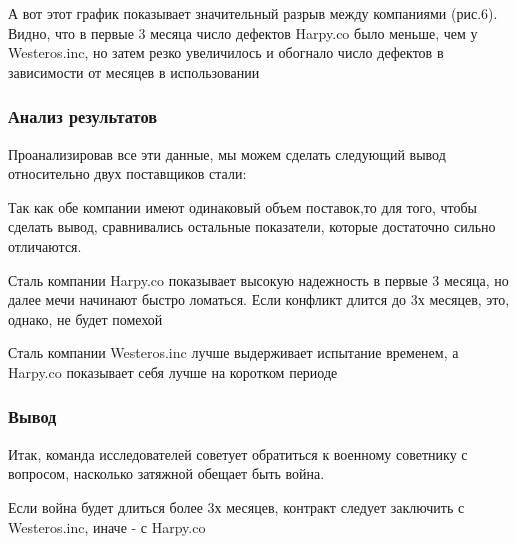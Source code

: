 \documentclass[8pt]{beamer}
\begin{document}
\begin{frame}
А вот этот график показывает значительный разрыв между компаниями (рис.6). Видно, что в первые 3 месяца число дефектов Harpy.co было меньше, чем у Westeros.inc, но затем резко увеличилось и обогнало число дефектов в зависимости от месяцев в использовании\\

\bigskip

\end{frame}

\begin{frame}
\frametitle{Анализ результатов}
Проанализировав все эти данные, мы можем сделать следующий вывод относительно двух поставщиков стали:\\

\bigskip

Так как обе компании имеют одинаковый объем поставок,то для того, чтобы сделать вывод, сравнивались остальные показатели, которые достаточно сильно отличаются.\\

\bigskip

Сталь компании {Harpy.co} показывает высокую надежность в первые 3 месяца, но далее мечи начинают быстро ломаться. Если конфликт длится до 3х месяцев, это, однако, не будет помехой\\

\bigskip

Сталь компании Westeros.inc лучше выдерживает испытание временем, а Harpy.co показывает себя лучше на коротком периоде\\

\end{frame}
\begin{frame}
\frametitle{Вывод}
Итак, команда исследователей советует обратиться к военному советнику с вопросом, насколько затяжной обещает быть война.

\bigskip

Если война будет длиться более 3х месяцев, контракт следует заключить с Westeros.inc, иначе - с Harpy.co
\end{frame}
\end{document}

